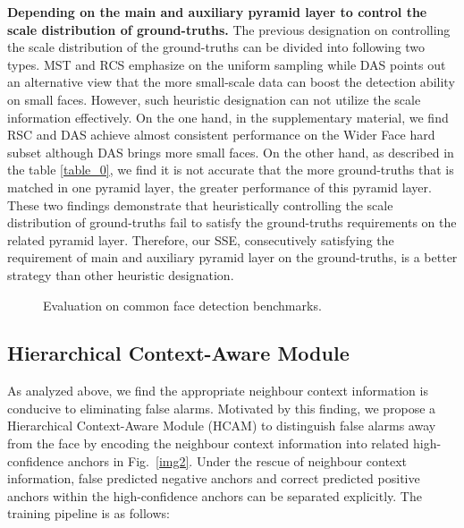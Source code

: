 \documentclass[10pt,twocolumn,letterpaper]{article}
\begin{document}
\noindent\textbf{Depending on the main and auxiliary pyramid layer to control the scale distribution of  ground-truths.} The previous designation on controlling the scale distribution of the ground-truths can be divided into following two types. MST and RCS emphasize on the uniform sampling while DAS points out an alternative view that the more small-scale data can boost the detection ability on small faces.
However, such heuristic designation can not utilize the scale information effectively. On the one hand, in the supplementary material, we find RSC and DAS achieve almost consistent performance on the Wider Face hard subset although DAS brings more small faces. On the other hand, as described in the table \ref{table_0}, we find it is not accurate that  the more ground-truths that is matched in one pyramid layer, the greater performance of this pyramid layer. These two findings demonstrate that heuristically controlling the scale distribution of ground-truths fail to satisfy the ground-truths requirements on the related pyramid layer.
Therefore, our SSE, consecutively satisfying the requirement of main and auxiliary pyramid layer on the ground-truths, is a better strategy than other heuristic designation.




\begin{figure*}[t]
    \centering
    \caption{Evaluation on common face detection benchmarks.}
    \label{img_4}
    \vspace{-5mm}
\end{figure*}

\subsection{Hierarchical Context-Aware Module}
As analyzed above, we find the appropriate neighbour context information is conducive to eliminating false alarms. Motivated by this finding, we propose a Hierarchical Context-Aware Module (HCAM) to distinguish false alarms away from the face by encoding the neighbour context information into related  high-confidence  anchors in Fig.~\ref{img2}. Under the rescue of neighbour context 
information, false predicted negative anchors and correct predicted positive anchors within the high-confidence anchors can be separated explicitly. The training pipeline is as follows:
\end{document}

